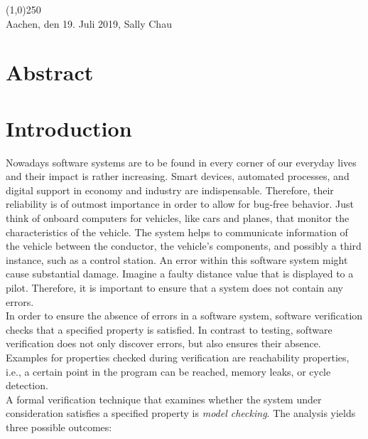 \documentclass[a4paper, 12pt, twoside]{report}
\begin{document}
	\noindent\line(1,0){250}\\
	Aachen, den 19. Juli 2019, Sally Chau
	
	\clearpage\mbox{}\clearpage
	
	\chapter*{Abstract}
	
	\clearpage\mbox{}\clearpage
	
	\doublespacing
	\tableofcontents
	\singlespacing
	\clearpage\mbox{}\clearpage
	\thispagestyle{empty} 
	
	\pagestyle{fancy}
	\fancyhead[RE]{\nouppercase\leftmark}
	\fancyhead[LO]{\nouppercase\rightmark}
	\fancyhead[LE,RO]{\thepage}
	\cfoot{}
	
	
	\chapter{Introduction}
	
	Nowadays software systems are to be found in every corner of our everyday lives and their impact is rather increasing. Smart devices, automated processes, and digital support in economy and industry are indispensable. Therefore, their reliability is of outmost importance in order to allow for bug-free behavior. Just think of onboard computers for vehicles, like cars and planes, that monitor the characteristics of the vehicle. The system helps to communicate information of the vehicle between the conductor, the vehicle's components, and possibly a third instance, such as a control station. An error within this software system might cause substantial damage. Imagine a faulty distance value that is displayed to a pilot. Therefore, it is important to ensure that a system does not contain any errors. \\
	
	In order to ensure the absence of errors in a software system, software verification  checks that a specified property is satisfied. In contrast to testing, software verification does not only discover errors, but also ensures their absence. Examples for properties checked during verification are reachability properties, i.e., a certain point in the program can be reached, memory leaks, or cycle detection.\\
	
	A formal verification technique that examines whether the system under consideration satisfies a specified property is \textit{model checking}. The analysis yields three possible outcomes:
	
\end{document}
